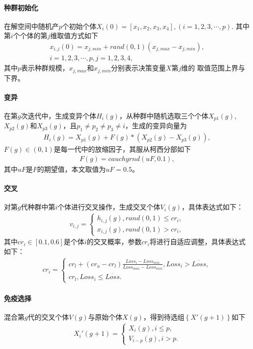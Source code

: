 \documentclass{whutmod}
\begin{document}
		\paragraph{种群初始化}
		在解空间中随机产$p$个初始个体$
		X_i(0)=[x_1,x_2,x_3,x_4],(i=1,2,3,\cdots,p).
		$
		其中第$i$个个体的第$j$维取值方式如下
		\begin{gather*}
		x_{i,j}(0)=x_{j,min}+rand(0,1)(x_{j,max}-x_{j,min}),\\i=1,2,3,\cdots,p,j=1,2,3,4,
		\end{gather*}
		其中$p$表示种群规模，$x_{j,max}$和$x_{j,min}$分别表示决策变量$X$第$j$维的
		取值范围上界与下界。
		\paragraph{变异}
		在第$g$次迭代中，生成变异个体$H_i(g)$，从种群中随机选取三个个体$X_{p1}(g)$,$X_{p2}(g)$和$X_{p3}(g)$，且$p_1\neq p_2\neq p_3\neq i$，生成的变异向量为
	    \begin{gather*}
	    H_i(g)=X_{p1}(g)+F(g)*(X_{p2}(g)-X_{p3}(g)),
	    \end{gather*}
	    $F(g)\in (0,1)$是每一代中的放缩因子，其服从柯西分部如下
	    \begin{gather*}
	    F(g)=cauchyrnd(uF,0.1),
	    \end{gather*}
	   其中$uF$是$F$的期望值，本文取值为$uF=0.5$。
		\paragraph{交叉}
		对第$g$代种群中第$i$个体进行交叉操作，生成交叉个体$V_i(g)$，具体表达式如下：
		\begin{gather}
		v_{i,j}=\left\{\begin{matrix}h_{i,j}(g),rand(0,1)\leq cr_{i},
		\\ x_{i,j}(g),rand(0,1)>cr_{i},
		\end{matrix}\right.
		\end{gather}
     	其中$cr_{i}\in[0.1,0.6]$是个体$i$的交叉概率，参数$cr_{i}$将进行自适应调整，具体表达式如下：
		\begin{gather}
		cr_{i}=\left\{\begin{matrix}cr_{l}+(cr_{u}-cr_{l})\frac{Loss_{i}-Loss_{min}}{Loss_{max}-Loss_{min}} , Loss_{i}>\overline{Loss},
		\\ cr_{l},Loss_{i}\leqslant  \overline{Loss}.
		\end{matrix}\right.
		\end{gather}
	    \paragraph{免疫选择}
	    混合第$g$代的交叉个体$V(g)$与原始个体$X(g)$，得到待选组$\left \{ X '(g+1)\right \}$如下
	    \begin{gather*}
	    X_i '(g+1)=\left\{\begin{matrix}  X_i (g),i\leqslant p,
	    \\  V_{i-p} (g),i>p.
	    \end{matrix}\right.
	    \end{gather*}
	    
\end{document}
